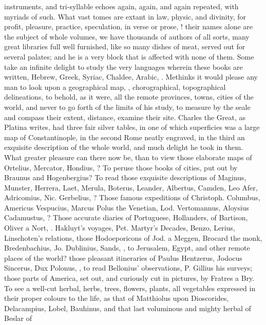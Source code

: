 {instruments, and tri-syllable echoes again, again, and again repeated,
with myriads of such. What vast tomes are extant in law, physic, and
divinity, for profit, pleasure, practice, speculation, in verse or
prose, \etc{}! their names alone are the subject of whole volumes, we have
thousands of authors of all sorts, many great libraries full well
furnished, like so many dishes of meat, served out for several palates;
and he is a very block that is affected with none of them. Some take an
infinite delight to study the very languages wherein these books are
written, Hebrew, Greek, Syriac, Chaldee, Arabic, \etc{}. Methinks it would
please any man to look upon a geographical map, , chorographical,
topographical delineations, to behold, as it were, all the remote
provinces, towns, cities of the world, and never to go forth of the
limits of his study, to measure by the seale and compass their extent,
distance, examine their site. Charles the Great, as Platina writes, had
three fair silver tables, in one of which superficies was a large map
of Constantinople, in the second Rome neatly engraved, in the third an
exquisite description of the whole world, and much delight he took in
them. What greater pleasure can there now be, than to view those
elaborate maps of Ortelius, Mercator, Hondius, \etc{}? To peruse
those books of cities, put out by Braunus and Hogenbergius? To read
those exquisite descriptions of Maginus, Munster, Herrera, Laet,
Merula, Boterus, Leander, Albertus, Camden, Leo Afer, Adricomius, Nic.
Gerbelius, \etc{}? Those famous expeditions of Christoph. Columbus,
Americus Vespucius, Marcus Polus the Venetian, Lod. Vertomannus,
Aloysius Cadamustus, \etc{}? Those accurate diaries of Portuguese,
Hollanders, of Bartison, Oliver a Nort, \etc{}. Hakluyt's voyages, Pet.
Martyr's Decades, Benzo, Lerius, Linschoten's relations, those
Hodoeporicons of Jod. a Meggen, Brocard the monk, Bredenbachius, Jo.
Dublinius, Sands, \etc{}, to Jerusalem, Egypt, and other remote places of
the world? those pleasant itineraries of Paulus Hentzerus, Jodocus
Sincerus, Dux Polonus, \etc{}, to read Bellonius' observations, P. Gillius
his surveys; those parts of America, set out, and curiously cut in
pictures, by Fratres a Bry. To see a well-cut herbal, herbs, trees,
flowers, plants, all vegetables expressed in their proper colours to
the life, as that of Matthiolus upon Dioscorides, Delacampius, Lobel,
Bauhinus, and that last voluminous and mighty herbal of Beslar of
}
